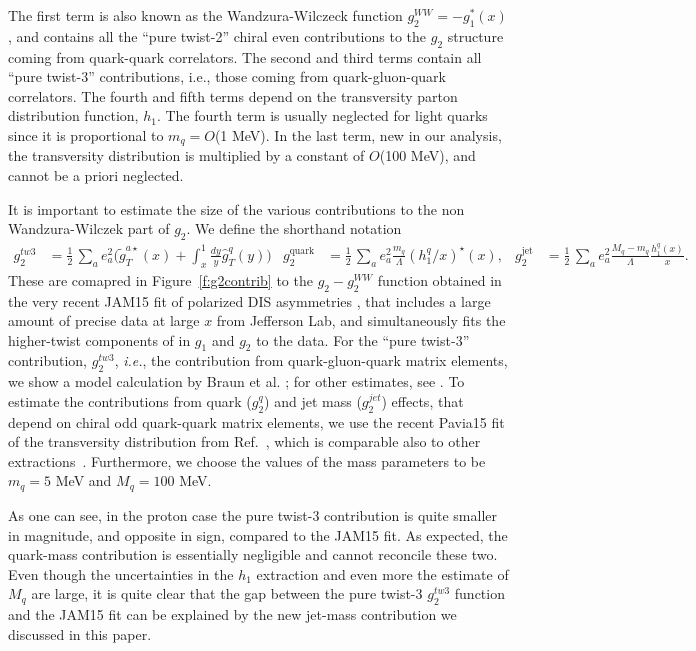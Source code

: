 \documentclass[preprintnumbers,floatfix,nofootinbib]{revtex4}
\newcommand{\mj}{M_q}
\newcommand{\mq}{m_q}
\begin{document}
The first term is also known as the Wandzura-Wilczeck function $g_2^{WW} =
-g_1^*(x)$ , and contains all the ``pure twist-2'' chiral even contributions to
the $g_2$ structure coming from quark-quark correlators. The second and third
terms contain all ``pure twist-3'' contributions, i.e., those coming from
quark-gluon-quark correlators. The fourth and fifth terms depend on the
transversity parton distribution function, $h_1$. 
The fourth term is usually neglected for
light quarks since it is proportional to $\mq=O$(1 MeV). In the last term,
new in our analysis, the transversity distribution is multiplied by a constant
of $O$(100 MeV), and cannot be a priori neglected.

It is important to estimate the size of the various contributions to the non Wandzura-Wilczek part of $g_2$. We define the shorthand notation
\begin{align}
g_2^{tw3} & = \frac{1}{2}\,\sum_a e_a^2
    \biggl(
    \widetilde g_T^{a \star}(x) 
    + \int_x^1\frac{dy}{y} \widehat{g}_T^q(y) 
    \biggr) 
&
g_2^{\text{quark}} &= \frac{1}{2}\,\sum_a e_a^2 
 \frac{\mq}{\Lambda} (h_1^q/x)^\star(x),
&
g_2^{\text{jet}} &= \frac{1}{2}\,\sum_a e_a^2 
\frac{\mj-\mq}{\Lambda} \frac{h_1^q(x)}{x}. 
\end{align} 
These are comapred in Figure~\ref{f:g2contrib} to the $g_2-g_2^{WW}$ function obtained in the very recent JAM15 fit of polarized DIS asymmetries \cite{JAM15}, that includes a large amount of precise data at large $x$ from Jefferson Lab, and simultaneously fits the higher-twist components of in $g_1$ and $g_2$ to the data. For the ``pure twist-3'' contribution, $g_2^{tw3}$, {\it i.e.}, the contribution from quark-gluon-quark matrix elements, we show a model calculation by Braun et al. \cite{Braun-et-al}; for other estimates, see \cite{Other-tw3-calcs}. To estimate the contributions from quark ($g_2^q$) and jet mass ($g_2^{jet}$) effects, that depend on chiral odd quark-quark matrix elements, we use the recent Pavia15 fit of the transversity distribution from Ref.~\cite{Radici:2015mwa}, which is comparable also to other
extractions~\cite{Anselmino:2013vqa,Kang:2015msa}. Furthermore, we choose the values of the mass parameters to be $\mq=5$ MeV and $\mj = 100$ MeV.

As one can see, in the proton case the pure twist-3 contribution is quite smaller in magnitude, and opposite in sign, compared to the JAM15 fit. As expected, the quark-mass contribution is essentially negligible and cannot reconcile these two. Even though the uncertainties in the $h_1$ extraction and even more the estimate of $M_q$ are large, it is quite clear that the gap between the pure twist-3 $g_2^{tw3}$ function and the JAM15 fit can be explained by the new jet-mass contribution we discussed in this paper. 
\end{document}
